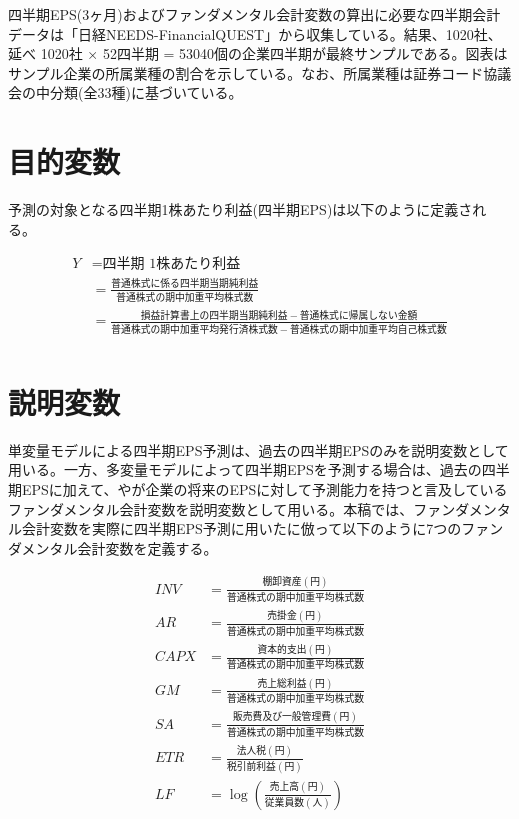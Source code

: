 \documentclass[a4paper, 12pt]{jsreport}
\begin{document}
四半期EPS(3ヶ月)およびファンダメンタル会計変数の算出に必要な四半期会計データは「日経NEEDS-FinancialQUEST」から収集している。結果、1020社、延べ 1020社 × 52四半期 = 53040個の企業四半期が最終サンプルである。図表はサンプル企業の所属業種の割合を示している。なお、所属業種は証券コード協議会の中分類(全33種)に基づいている。


\section{目的変数}

予測の対象となる四半期1株あたり利益(四半期EPS)は以下のように定義される。

\begin{equation}
  \begin{split}
    Y &= \text{四半期 1株あたり利益} \\
    &= \frac{普通株式に係る四半期当期純利益}{普通株式の期中加重平均株式数} \\
    &= \frac{損益計算書上の四半期当期純利益-普通株式に帰属しない金額}{普通株式の期中加重平均発行済株式数 - 普通株式の期中加重平均自己株式数} \\  
  \end{split}
\end{equation}

\section{説明変数}

単変量モデルによる四半期EPS予測は、過去の四半期EPSのみを説明変数として用いる。一方、多変量モデルによって四半期EPSを予測する場合は、過去の四半期EPSに加えて、\cite{lev1993fundamental}や\cite{abarbanell1997fundamental}が企業の将来のEPSに対して予測能力を持つと言及しているファンダメンタル会計変数を説明変数として用いる。本稿では、ファンダメンタル会計変数を実際に四半期EPS予測に用いた\cite{zhang2004neural}に倣って以下のように7つのファンダメンタル会計変数を定義する。

\begin{equation}
  \begin{split}
    INV &= \frac{棚卸資産(円)}{普通株式の期中加重平均株式数} \\
    AR &= \frac{売掛金(円)}{普通株式の期中加重平均株式数} \\
    CAPX &= \frac{資本的支出(円)}{普通株式の期中加重平均株式数} \\
    GM &= \frac{売上総利益(円)}{普通株式の期中加重平均株式数} \\
    SA &= \frac{販売費及び一般管理費(円)}{普通株式の期中加重平均株式数} \\
    ETR &= \frac{法人税(円)}{税引前利益(円)} \\
    LF &= \log{\left(\frac{売上高(円)}{従業員数(人)}\right)} \\
  \end{split}
\end{equation}
\end{document}
